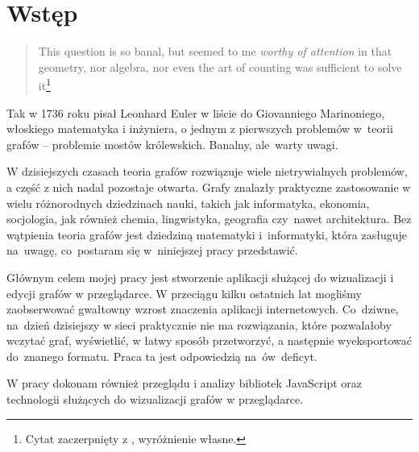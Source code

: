 \chapter*{Wstęp}

\blockquote{This question is so banal, but seemed to me \emph{worthy of attention} in that geometry, nor algebra, nor even the art of counting was sufficient to solve it\footnote{Cytat zaczerpnięty z \cite{hopkins}, wyróżnienie własne.}}. Tak w 1736 roku pisał Leonhard Euler w liście do Giovanniego Marinoniego, włoskiego matematyka i inżyniera, o jednym z pierwszych problemów w~teorii grafów -- problemie mostów królewskich. Banalny, ale~warty uwagi.

W dzisiejszych czasach teoria grafów rozwiązuje wiele nietrywialnych problemów, a część z nich nadal pozostaje otwarta. Grafy znalazły praktyczne zastosowanie w wielu różnorodnych dziedzinach nauki, takich jak informatyka, ekonomia, socjologia, jak również chemia, lingwistyka, geografia czy~nawet architektura. Bez wątpienia teoria grafów jest dziedziną matematyki i~informatyki, która zasługuje na~uwagę, co~postaram się w~niniejszej pracy przedstawić.

Głównym celem mojej pracy jest stworzenie aplikacji służącej do wizualizacji i edycji grafów w przeglądarce. W przeciągu kilku ostatnich lat mogliśmy zaobserwować gwałtowny wzrost znaczenia aplikacji internetowych. Co~dziwne, na~dzień dzisiejszy w sieci praktycznie nie ma rozwiązania, które pozwalałoby wczytać graf, wyświetlić, w łatwy sposób przetworzyć, a następnie wyeksportować do~znanego formatu. Praca ta jest odpowiedzią na~ów~deficyt. 

W pracy dokonam również przeglądu i analizy bibliotek JavaScript oraz technologii służących do wizualizacji grafów w przeglądarce. 

\thispagestyle{empty}
